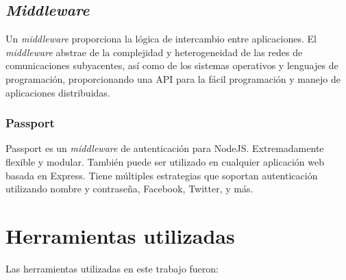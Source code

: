 \subsection{	\textit{Middleware}}
Un \textit{middleware} proporciona la lógica de intercambio entre aplicaciones. El \textit{middleware} abstrae de la complejidad y heterogeneidad de las redes de comunicaciones subyacentes, así como de los sistemas operativos y lenguajes de programación, proporcionando una API para la fácil programación y manejo de aplicaciones distribuidas.


\subsubsection{Passport}
Passport es un \textit{middleware} de autenticación para NodeJS. Extremadamente flexible y modular. También puede ser utilizado en cualquier aplicación web basada en Express. Tiene múltiples estrategias que soportan autenticación utilizando nombre y contraseña, Facebook, Twitter, y más\cite{passport}. 


\section{Herramientas utilizadas}
Las herramientas utilizadas en este trabajo fueron:

